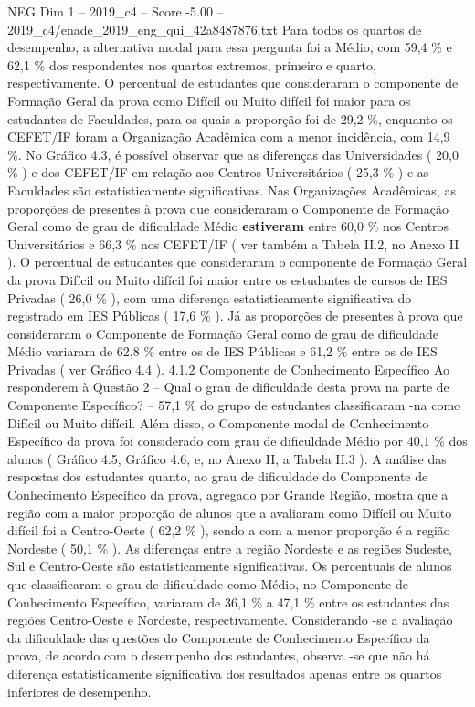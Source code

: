 \begin{textsample}{NEG Dim 1 – 2019\_c4 – Score -5.00 – 2019\_c4/enade\_2019\_eng\_qui\_42a8487876.txt}
Para todos os quartos de desempenho, a alternativa modal para essa pergunta foi a Médio, com 59,4 \% e 62,1 \% dos respondentes nos quartos extremos, primeiro e quarto, respectivamente.
O percentual de estudantes que consideraram o componente de Formação Geral da prova como Difícil ou Muito difícil foi maior para os estudantes de Faculdades, para os quais a proporção foi de 29,2 \%, enquanto os CEFET/IF foram a Organização Acadêmica com a menor incidência, com 14,9 \%.
No Gráfico 4.3, é possível observar que as diferenças das Universidades ( 20,0 \% ) e dos CEFET/IF em relação aos Centros Universitários ( 25,3 \% ) e as Faculdades são estatisticamente significativas.
Nas Organizações Acadêmicas, as proporções de presentes à prova que consideraram o Componente de Formação Geral como de grau de dificuldade Médio \textbf{estiveram} entre 60,0 \% nos Centros Universitários e 66,3 \% nos CEFET/IF ( ver também a Tabela II.2, no Anexo II ).
O percentual de estudantes que consideraram o componente de Formação Geral da prova Difícil ou Muito difícil foi maior entre os estudantes de cursos de IES Privadas ( 26,0 \% ), com uma diferença estatisticamente significativa do registrado em IES Públicas ( 17,6 \% ).
Já as proporções de presentes à prova que consideraram o Componente de Formação Geral como de grau de dificuldade Médio variaram de 62,8 \% entre os de IES Públicas e 61,2 \% entre os de IES Privadas ( ver Gráfico 4.4 ). 4.1.2 Componente de Conhecimento Específico Ao responderem à Questão 2 – Qual o grau de dificuldade desta prova na parte de Componente Específico? – 57,1 \% do grupo de estudantes classificaram -na como Difícil ou Muito difícil.
Além disso, o Componente modal de Conhecimento Específico da prova foi considerado com grau de dificuldade Médio por 40,1 \% dos alunos ( Gráfico 4.5, Gráfico 4.6, e, no Anexo II, a Tabela II.3 ).
A análise das respostas dos estudantes quanto, ao grau de dificuldade do Componente de Conhecimento Específico da prova, agregado por Grande Região, mostra que a região com a maior proporção de alunos que a avaliaram como Difícil ou Muito difícil foi a Centro-Oeste ( 62,2 \% ), sendo a com a menor proporção é a região Nordeste ( 50,1 \% ).
As diferenças entre a região Nordeste e as regiões Sudeste, Sul e Centro-Oeste são estatisticamente significativas.
Os percentuais de alunos que classificaram o grau de dificuldade como Médio, no Componente de Conhecimento Específico, variaram de 36,1 \% a 47,1 \% entre os estudantes das regiões Centro-Oeste e Nordeste, respectivamente.
Considerando -se a avaliação da dificuldade das questões do Componente de Conhecimento Específico da prova, de acordo com o desempenho dos estudantes, observa -se que não há diferença estatisticamente significativa dos resultados apenas entre os quartos inferiores de desempenho.

\end{textsample}
